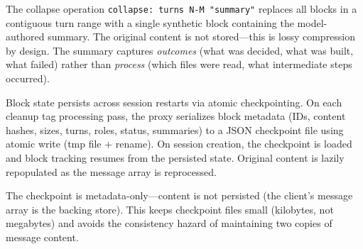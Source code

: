 The collapse operation \texttt{collapse: turns N-M "summary"} replaces
all blocks in a contiguous turn range with a single synthetic block
containing the model-authored summary. The original content is not
stored---this is lossy compression by design. The summary captures
\emph{outcomes} (what was decided, what was built, what failed) rather
than \emph{process} (which files were read, what intermediate steps
occurred).

Block state persists across session restarts via atomic checkpointing.
On each cleanup tag processing pass, the proxy serializes block metadata
(IDs, content hashes, sizes, turns, roles, status, summaries) to a JSON
checkpoint file using atomic write (tmp file + rename). On session
creation, the checkpoint is loaded and block tracking resumes from the
persisted state. Original content is lazily repopulated as the message
array is reprocessed.

The checkpoint is metadata-only---content is not persisted (the client's
message array is the backing store). This keeps checkpoint files small
(kilobytes, not megabytes) and avoids the consistency hazard of
maintaining two copies of message content.

